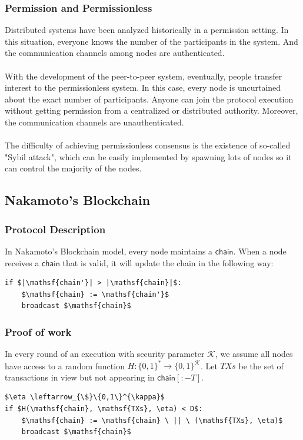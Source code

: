 \documentclass[
10pt, %
a4paper, %
oneside, %
headinclude,footinclude, %
BCOR5mm, %
]{scrartcl}
\begin{document}
\subsubsection{Permission and Permissionless}

Distributed systems have been analyzed historically in a permission setting. In this situation, everyone knows the number of the participants in the system. And the communication channels among nodes are authenticated.\\ \\ 
With the development of the peer-to-peer system, eventually, people transfer interest to the permissionless system. In this case, every node is uncurtained about the exact number of participants. Anyone can join the protocol execution without getting permission from a centralized or distributed authority. Moreover, the communication channels are unauthenticated.\\ \\
The difficulty of achieving permissionless consensus is the existence of so-called "Sybil attack", which can be easily implemented by spawning lots of nodes so it can control the majority of the nodes.
 

\subsection{Nakamoto’s Blockchain}
\subsubsection{Protocol Description}
  In Nakamoto's Blockchain model, every node maintains a $\mathsf{chain}$.
  When a node receives a $\mathsf{chain}$ that is valid, it will update the chain in the following way:
 \begin{lstlisting}
if $|\mathsf{chain'}| > |\mathsf{chain}|$:
    $\mathsf{chain} := \mathsf{chain'}$
    broadcast $\mathsf{chain}$
  \end{lstlisting}
\subsubsection{Proof of work}
In every round of an execution with security parameter $\mathcal{K}$, we assume all nodes have access to a random function $H:\{0 , 1\}    ^* \rightarrow \{0, 1\}^\mathcal{K}$. Let $TXs$ be the set of transactions in view but not appearing in $\mathsf{chain}[:-T]$.
\begin{lstlisting}
$\eta \leftarrow_{\$}\{0,1\}^{\kappa}$
if $H(\mathsf{chain}, \mathsf{TXs}, \eta) < D$:
    $\mathsf{chain} := \mathsf{chain} \ || \ (\mathsf{TXs}, \eta)$
    broadcast $\mathsf{chain}$
\end{lstlisting}
\end{document}

